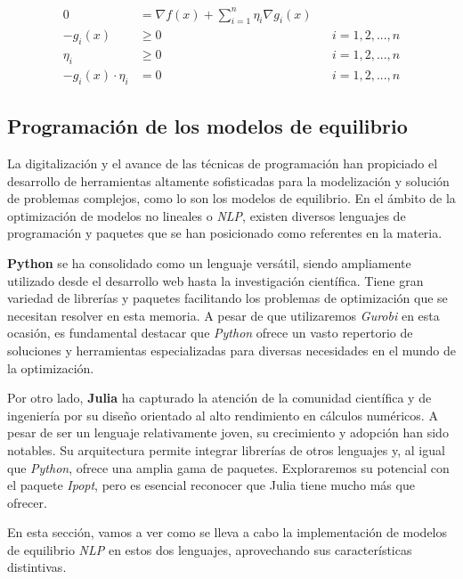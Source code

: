 \begin{align}
    0 &= \nabla f(x) + \sum_{i=1}^{n} \eta_{i}\nabla g_{i}(x) \label{condicion1}\\
    -g_{i}(x) &\geq 0 & & i=1,2,...,n  \label{condicion2}\\
    \eta_{i} &\geq 0 & & i=1,2,...,n \label{condicion3}\\
    -g_{i}(x) \cdot \eta_{i} &= 0 & & i=1,2,...,n \label{condicion4}
\end{align}

\subsection{Programación de los modelos de equilibrio}\label{c26.2}

La digitalización y el avance de las técnicas de programación han propiciado el desarrollo de herramientas altamente sofisticadas para la modelización y solución de problemas complejos, como lo son los modelos de equilibrio. En el ámbito de la optimización de modelos no lineales o \textit{NLP}, existen diversos lenguajes de programación y paquetes que se han posicionado como referentes en la materia.

\vspace{2.5mm}
\textbf{Python} se ha consolidado como un lenguaje versátil, siendo ampliamente utilizado desde el desarrollo web hasta la investigación científica. Tiene gran variedad de librerías y paquetes facilitando los problemas de optimización que se necesitan resolver en esta memoria. A pesar de que utilizaremos \textit{Gurobi} en esta ocasión, es fundamental destacar que \textit{Python} ofrece un vasto repertorio de soluciones y herramientas especializadas para diversas necesidades en el mundo de la optimización.

\vspace{2.5mm}
Por otro lado, \textbf{Julia} ha capturado la atención de la comunidad científica y de ingeniería por su diseño orientado al alto rendimiento en cálculos numéricos. A pesar de ser un lenguaje relativamente joven, su crecimiento y adopción han sido notables. Su arquitectura permite integrar librerías de otros lenguajes y, al igual que \textit{Python}, ofrece una amplia gama de paquetes. Exploraremos su potencial con el paquete \textit{Ipopt}, pero es esencial reconocer que Julia tiene mucho más que ofrecer.

\vspace{2.5mm}
En esta sección, vamos a ver como se lleva a cabo la implementación de modelos de equilibrio \textit{NLP} en estos dos lenguajes, aprovechando sus características distintivas.

